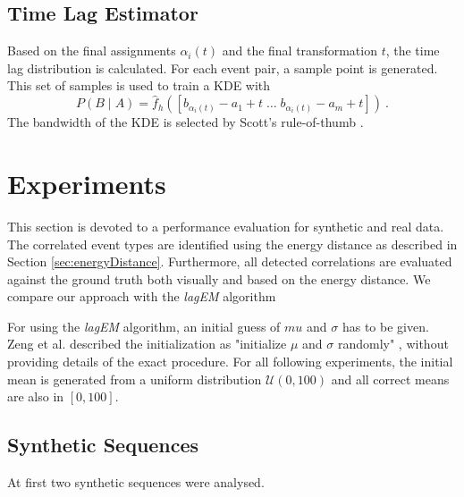 \documentclass[conference]{IEEEtran}
\theoremstyle{examplestyle}
\begin{document}
\subsection{Time Lag Estimator} \label{sec:labestimator}
Based on the final assignments $\alpha_i(t)$ and the final transformation $t$, the time lag distribution is calculated. For each event pair, a sample point is generated. This set of samples is used to train a \ac{KDE} with
\begin{equation}
	\label{eq:solutionICP}
	P(B \; | \; A) = \hat{f}_h \left(
		\left[
			b_{\alpha_i(t)} - a_1 + t \;
			\dots \;
			b_{\alpha_i(t)} - a_m + t
		\right] \right)~.
\end{equation}
The bandwidth of the \ac{KDE} is selected by Scott's rule-of-thumb \cite{Scott1992}.












\section{Experiments} \label{sec:exp}

This section is devoted to a performance evaluation for synthetic and real data. The correlated event types are identified using the energy distance as described in Section \ref{sec:energyDistance}. Furthermore, all detected correlations are evaluated against the  ground truth both visually and based on the energy distance.
We compare our approach with the \textit{lagEM} algorithm \cite{Zeng2015}

For using the \textit{lagEM} algorithm, an initial guess of \(mu\) and \(\sigma\) has to be given. Zeng et al. described the initialization as "initialize \(\mu\) and \(\sigma\) randomly" \cite{Zeng2015}, without providing details of the exact procedure. For all following experiments, the initial mean is generated from a uniform distribution \(\mathcal{U}(0, 100)\) and all correct means are also in \([0, 100]\).





\subsection{Synthetic Sequences}

At first two synthetic sequences were analysed. 
\end{document}
